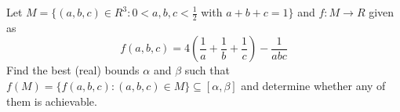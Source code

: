 Let $M = \{(a,b,c)\in R^3 :0 <a,b,c<\frac12$  with  $a+b+c=1 \}$ and  $f: M\to  R$ given as  $$f(a,b,c)=4\left(\frac{1}{a}+\frac{1}{b}+\frac{1}{c}\right)-\frac{1}{abc}$$Find the best (real) bounds $\alpha$ and $\beta$ such that $f(M) = \{f(a,b,c): (a,b,c)\in M\}\subseteq [\alpha,\beta]$ and determine whether any of them is achievable.